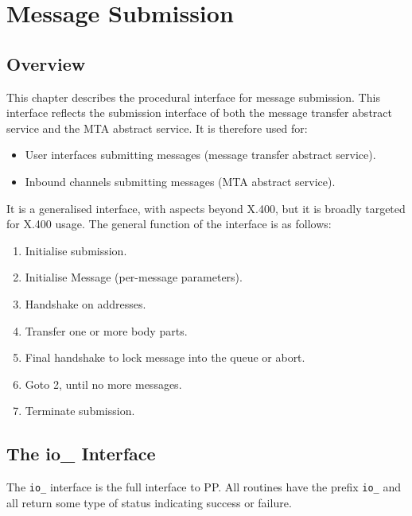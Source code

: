 \chapter {Message Submission}

\section {Overview}

This chapter describes the procedural interface for message
submission.  This interface reflects the submission interface of both
the message transfer abstract service and the MTA abstract service.
It is therefore used for:

\begin{itemize}
\item User interfaces submitting messages (message transfer abstract
service).

\item Inbound channels submitting messages (MTA abstract service).
\end{itemize}

It is a generalised interface, with aspects beyond X.400, but it is
broadly targeted for X.400 usage.  The general function of the
interface is as follows:

\begin{enumerate}
\item Initialise submission.

\item Initialise Message (per-message parameters).

\item Handshake on addresses.

\item Transfer one or more body parts.

\item Final handshake to lock message into the queue or abort.

\item Goto 2, until no more messages.

\item Terminate submission.
\end{enumerate}

\section {The io\_ Interface}

The \verb|io_| interface is the full interface to PP. All routines
have the prefix \verb|io_| and all return some type of status
indicating success or failure.


